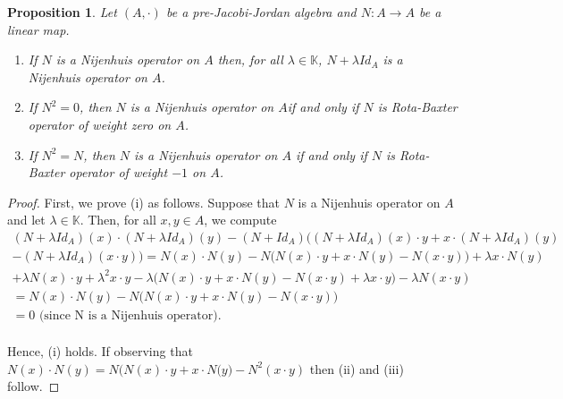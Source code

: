\documentclass[12pt]{amsart}
\newtheorem{proposition}[Theorem]{Proposition}
\begin{document}
	\begin{proposition}\label{Pro11}
		Let $ (A,\cdot) $ be a pre-Jacobi-Jordan algebra and $ N : A\to A $ be a linear map.
		\begin{enumerate}
			\item[(i)]If $ N $ is a Nijenhuis operator on $A$ then, for all $ \lambda\in \mathbb{K} $, $ N+\lambda Id_{A} $ is a Nijenhuis operator on $ A $.
			\item[(ii)]	If $ N^{2}=0 $, then $ N $ is a Nijenhuis operator  on $A$if and only if $ N $ is Rota-Baxter operator of weight zero on $ A $.
			\item[(iii)] If $ N^{2}=N $, then $ N $ is a Nijenhuis operator on $A$ if and only if $ N $ is Rota-Baxter operator of weight $ -1 $ on $ A $.  
		\end{enumerate}
	\end{proposition}
	\begin{proof}
		First, we prove (i) as follows. Suppose that $N$ is a Nijenhuis operator on $A$ and  let $\lambda\in \mathbb{K}$. Then, for all $ x,y\in A $, we compute \\
		$ \begin{array}{lll}
			(N+\lambda Id_{A})(x)\cdot(N+\lambda Id_{A})(y)-(N+Id_{A})\bigg((N+\lambda Id_{A})(x)\cdot y+x\cdot(N+\lambda Id_{A})(y)\\
			-(N+\lambda Id_{A})(x\cdot y)\bigg)=N(x)\cdot N(y)-N\bigg(N(x)\cdot y+x\cdot N(y)-N(x\cdot y)\bigg)+\lambda x\cdot N(y)\\
			+\lambda N(x)\cdot y+\lambda^{2}x\cdot y-\lambda\bigg(N(x)\cdot y+x\cdot N(y)-N(x\cdot y)+\lambda x\cdot y\bigg)-\lambda N(x\cdot y)\\
			=N(x)\cdot N(y)-N\bigg(N(x)\cdot y+x\cdot N(y)-N(x\cdot y)\bigg)\\
			=0 \text{  (since N is a Nijenhuis operator)}.	
		\end{array} $\\\\
		Hence, (i) holds.
		If observing that $ N(x)\cdot N(y)=N\bigg(N(x)\cdot y+x\cdot N(y\bigg)-N^{2}(x\cdot y) $  then  (ii) and (iii) follow.	
	\end{proof}	
\end{document}

